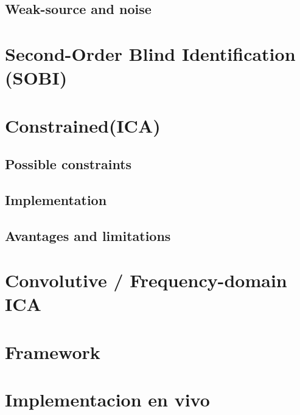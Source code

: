 \subsection{Weak-source and noise}
\section{Second-Order Blind Identification (SOBI)}
\section{Constrained(ICA)}
\subsection{Possible constraints}
\subsection{Implementation}
\subsection{Avantages and limitations}
\section{Convolutive / Frequency-domain ICA}
\section{Framework}
\section{Implementacion en vivo}